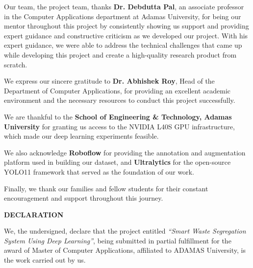 \documentclass[BTech]{audiss}
\begin{document}
Our team, the project team, thanks \textbf{Dr. Debdutta Pal}, an associate professor in the Computer Applications department at Adamas University, for being our mentor throughout this project by consistently showing us support and providing expert guidance and constructive criticism as we developed our project. With his expert guidance, we were able to address the technical challenges that came up while developing this project and create a high-quality research product from scratch.

We express our sincere gratitude to \textbf{Dr. Abhishek Roy}, Head of the Department of Computer Applications, for providing an excellent academic environment and the necessary resources to conduct this project successfully.

We are thankful to the \textbf{School of Engineering \& Technology, Adamas University} for granting us access to the NVIDIA L40S GPU infrastructure, which made our deep learning experiments feasible.

We also acknowledge \textbf{Roboflow} for providing the annotation and augmentation platform used in building our dataset, and \textbf{Ultralytics} for the open-source YOLO11 framework that served as the foundation of our work.

Finally, we thank our families and fellow students for their constant encouragement and support throughout this journey.

\pagebreak

\begin{center}
{\Large \textbf{DECLARATION}}\\[2em]
\end{center}

\noindent
We, the undersigned, declare that the project entitled \textit{``Smart Waste Segregation System Using Deep Learning''}, being submitted in partial fulfillment for the award of Master of Computer Applications, affiliated to ADAMAS University, is the work carried out by us.
\end{document}
